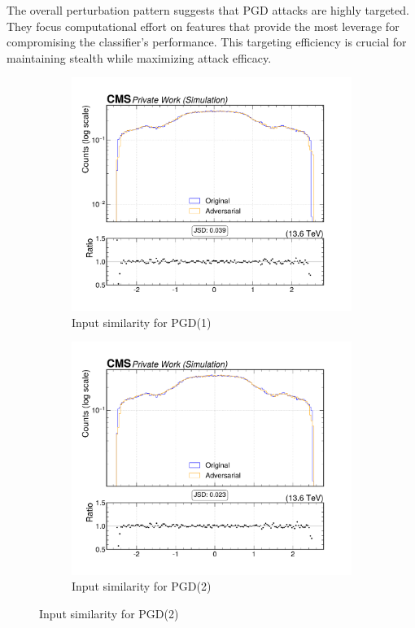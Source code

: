 The overall perturbation pattern suggests that PGD attacks are highly targeted. They focus computational effort on features that provide the most leverage for compromising the classifier's performance. This targeting efficiency is crucial for maintaining stealth while maximizing attack efficacy.

\begin{figure}[htbp]
  \centering
  \begin{subfigure}[t]{0.5\textwidth}
    \includegraphics[width=\linewidth]{media/output/features/compare/pgd_1/cmp_global_features_jet_eta.pdf}
    \caption{Input similarity for PGD(1)}
    \label{fig:left}
  \end{subfigure}\hfill
  \begin{subfigure}[t]{0.5\textwidth}
    \includegraphics[width=\linewidth]{media/output/features/compare/pgd_2/cmp_global_features_jet_eta.pdf}
    \caption{Input similarity for PGD(2)}
    \label{fig:middle}
  \end{subfigure}\hfill


\end{figure}
